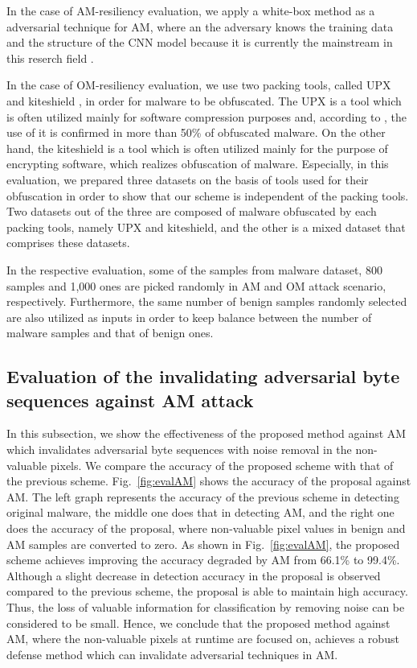 \documentclass{ieeeaccess}
\newcommand{\myfigurename}{Fig.}
\begin{document}
In the case of AM-resiliency evaluation, we apply a white-box method as a adversarial technique for AM, where an the adversary knows the training data and the structure of the CNN model because it is currently the mainstream in this reserch field \cite{yamafumi, am, ae}.

In the case of OM-resiliency evaluation, we use two packing tools, called UPX \cite{upx} and kiteshield \cite{kiteshield}, in order for malware to be obfuscated.
The UPX is a tool which is often utilized mainly for software compression purposes and, according to \cite{pack_research}, the use of it is confirmed in more than 50\% of obfuscated malware. 
On the other hand, the kiteshield is a tool which is often utilized mainly for the purpose of encrypting software, which realizes obfuscation of malware.
Especially, in this evaluation, we prepared three datasets on the basis of tools used for their obfuscation in order to show that our scheme is independent of the packing tools.
Two datasets out of the three are composed of malware obfuscated by each packing tools, namely UPX and kiteshield, and the other is a mixed dataset that comprises these datasets.

In the respective evaluation, some of the samples from malware dataset, 800 samples and 1,000 ones are picked randomly in AM and OM attack scenario, respectively.
Furthermore, the same number of benign samples randomly selected are also utilized as inputs in order to keep balance between the number of malware samples and that of benign ones.

\subsection{Evaluation of the invalidating adversarial byte sequences against AM attack}
In this subsection, we show the effectiveness of the proposed method against AM which invalidates adversarial byte sequences with noise removal in the non-valuable pixels.
We compare the accuracy of the proposed scheme with that of the previous scheme.
\myfigurename~\ref{fig:evalAM} shows the accuracy of the proposal against AM.
The left graph represents the accuracy of the previous scheme in detecting original malware, the middle one does that in detecting AM, and the right one does the accuracy of the proposal, where non-valuable pixel values in benign and AM samples are converted to zero.
As shown in \myfigurename~\ref{fig:evalAM}, the proposed scheme achieves improving the accuracy degraded by AM from 66.1\% to 99.4\%.
Although a slight decrease in detection accuracy in the proposal is observed compared to the previous scheme, the proposal is able to maintain high accuracy.
Thus, the loss of valuable information for classification by removing noise can be considered to be small.
Hence, we conclude that the proposed method against AM, where the non-valuable pixels at runtime are focused on, achieves a robust defense method which can invalidate adversarial techniques in AM.
\end{document}
